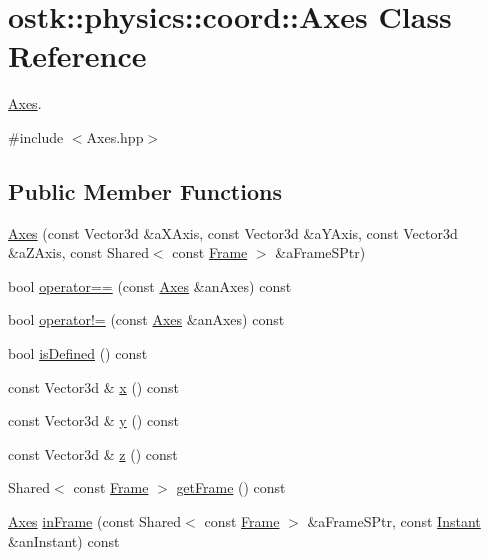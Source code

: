 \hypertarget{classostk_1_1physics_1_1coord_1_1_axes}{}\section{ostk\+:\+:physics\+:\+:coord\+:\+:Axes Class Reference}
\label{classostk_1_1physics_1_1coord_1_1_axes}


\hyperlink{classostk_1_1physics_1_1coord_1_1_axes}{Axes}.  




{\ttfamily \#include $<$Axes.\+hpp$>$}

\subsection*{Public Member Functions}
\begin{DoxyCompactItemize}
\item 
\hyperlink{classostk_1_1physics_1_1coord_1_1_axes_abed0f87ab7a6a493f3576a8fa7426051}{Axes} (const Vector3d \&a\+X\+Axis, const Vector3d \&a\+Y\+Axis, const Vector3d \&a\+Z\+Axis, const Shared$<$ const \hyperlink{classostk_1_1physics_1_1coord_1_1_frame}{Frame} $>$ \&a\+Frame\+S\+Ptr)
\item 
bool \hyperlink{classostk_1_1physics_1_1coord_1_1_axes_ab28c34155d35eb5ca4c3c84d471792bf}{operator==} (const \hyperlink{classostk_1_1physics_1_1coord_1_1_axes}{Axes} \&an\+Axes) const
\item 
bool \hyperlink{classostk_1_1physics_1_1coord_1_1_axes_a71d4cfeb7bed5579e5ed8ba9f1342025}{operator!=} (const \hyperlink{classostk_1_1physics_1_1coord_1_1_axes}{Axes} \&an\+Axes) const
\item 
bool \hyperlink{classostk_1_1physics_1_1coord_1_1_axes_a56e7a631f4e515bd6b5e95653ca0d11e}{is\+Defined} () const
\item 
const Vector3d \& \hyperlink{classostk_1_1physics_1_1coord_1_1_axes_a3e982cbaeccbb99c2115fb30a46dd520}{x} () const
\item 
const Vector3d \& \hyperlink{classostk_1_1physics_1_1coord_1_1_axes_a5eb9d996136fc5fedd2db9410744af76}{y} () const
\item 
const Vector3d \& \hyperlink{classostk_1_1physics_1_1coord_1_1_axes_a56a219efa05ba3b614e1ae52b27ae8a6}{z} () const
\item 
Shared$<$ const \hyperlink{classostk_1_1physics_1_1coord_1_1_frame}{Frame} $>$ \hyperlink{classostk_1_1physics_1_1coord_1_1_axes_ab04691d1fc3fd877251e135a84806cec}{get\+Frame} () const
\item 
\hyperlink{classostk_1_1physics_1_1coord_1_1_axes}{Axes} \hyperlink{classostk_1_1physics_1_1coord_1_1_axes_adf93e7d5372a112c86abbfa7a2ad431b}{in\+Frame} (const Shared$<$ const \hyperlink{classostk_1_1physics_1_1coord_1_1_frame}{Frame} $>$ \&a\+Frame\+S\+Ptr, const \hyperlink{classostk_1_1physics_1_1time_1_1_instant}{Instant} \&an\+Instant) const
\end{DoxyCompactItemize}
